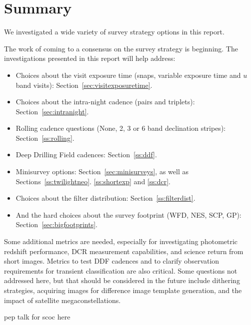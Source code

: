 \section{Summary}

We investigated a wide variety of survey strategy options in this report. 



The work of coming to a consensus on the survey strategy is beginning. The investigations presented in this report will help address:
\begin{itemize}
\item Choices about the visit exposure time (snaps, variable exposure time and $u$ band visits): Section~\ref{sec:visitexposuretime}.
\item Choices about the intra-night cadence (pairs and triplets): Section~\ref{sec:intranight}.
\item Rolling cadence questions (None, 2, 3 or 6 band declination stripes): Section~\ref{ss:rolling}.
\item Deep Drilling Field cadences: Section~\ref{ss:ddf}.
\item Minisurvey options: Section~\ref{sec:minisurveys}, as well as Sections~\ref{ss:twilightneo}. \ref{ss:shortexp} and \ref{ss:dcr}.
\item Choices about the filter distribution: Section~\ref{ss:filterdist}.
\item And the hard choices about the survey footprint (WFD, NES, SCP, GP): Section~\ref{sec:bigfootprints}.
\end{itemize}
Some additional metrics are needed, especially for investigating photometric redshift performance, DCR measurement capabilities, and science return from short images. Metrics to test DDF cadences and to clarify observation requirements for transient classification are also critical. Some questions not addressed here, but that should be considered in the future include dithering strategies, acquiring images for difference image template generation, and the impact of satellite megaconstellations. 

pep talk for scoc here 